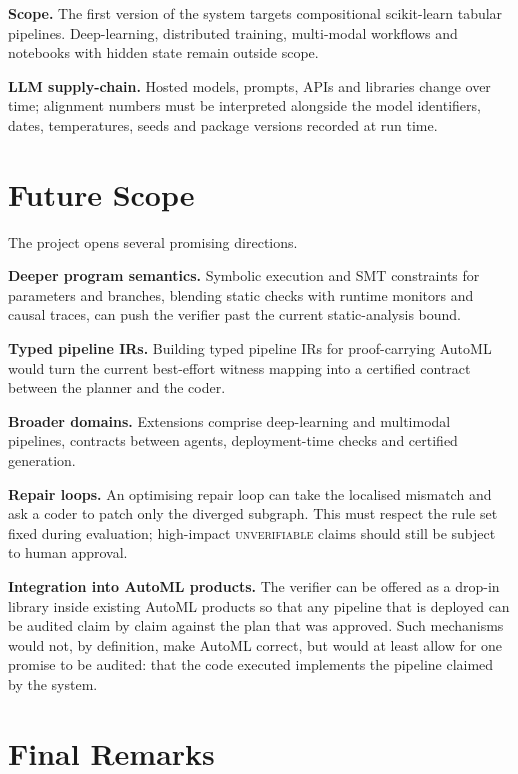 \textbf{Scope.} The first version of the system targets
compositional scikit-learn tabular pipelines. Deep-learning,
distributed training, multi-modal workflows and notebooks with
hidden state remain outside scope.

\textbf{LLM supply-chain.} Hosted models, prompts, APIs and
libraries change over time; alignment numbers must be interpreted
alongside the model identifiers, dates, temperatures, seeds and
package versions recorded at run time.

\section{Future Scope}

The project opens several promising directions.

\textbf{Deeper program semantics.} Symbolic execution and SMT
constraints for parameters and branches, blending static checks with
runtime monitors and causal traces, can push the verifier past the
current static-analysis bound.

\textbf{Typed pipeline IRs.} Building typed pipeline IRs for
proof-carrying AutoML would turn the current best-effort witness
mapping into a certified contract between the planner and the coder.

\textbf{Broader domains.} Extensions comprise deep-learning and
multimodal pipelines, contracts between agents, deployment-time
checks and certified generation.

\textbf{Repair loops.} An optimising repair loop can take the
localised mismatch and ask a coder to patch only the diverged
subgraph. This must respect the rule set fixed during evaluation;
high-impact \textsc{unverifiable} claims should still be subject
to human approval.

\textbf{Integration into AutoML products.} The verifier can be
offered as a drop-in library inside existing AutoML products so
that any pipeline that is deployed can be audited claim by claim
against the plan that was approved. Such mechanisms would not, by
definition, make AutoML correct, but would at least allow for one
promise to be audited: that the code executed implements the
pipeline claimed by the system.

\section{Final Remarks}

